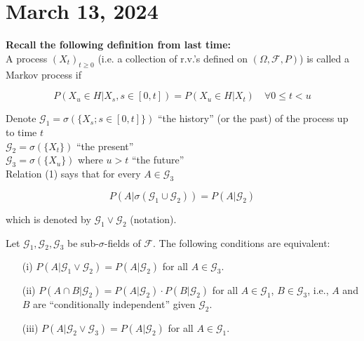\section{March 13, 2024}
\textbf{Recall the following definition from last time:} \\
A process $(X_t)_{t\geq0}$ (i.e. a collection of r.v.'s defined on $(\Omega, \mathcal{F}, P)$) is called a Markov process if 

\begin{equation}
    P(X_u \in H | X_s, s \in [0,t]) = P(X_u \in H | X_t) \quad \forall 0 \leq t < u
\end{equation}

Denote $\mathcal{G}_1 = \sigma(\{X_s ; s \in [0,t]\})$ ``the history'' (or the past) of the process up to time $t$ \\
$\mathcal{G}_2 = \sigma(\{X_t\})$ ``the present'' \\
$\mathcal{G}_3 = \sigma(\{X_u\})$ where $u>t$ ``the future'' \\
Relation (1) says that for every $A \in \mathcal{G}_3$

\begin{equation}
    P(A | \sigma(\mathcal{G}_1 \cup \mathcal{G}_2)) = P(A | \mathcal{G}_2)
\end{equation}

which is denoted by $\mathcal{G}_1 \lor \mathcal{G}_2$ (notation).


\begin{lemma}[Problem 3.11]
Let $\mathcal{G}_1, \mathcal{G}_2, \mathcal{G}_3$ be sub-$\sigma$-fields of $\mathcal{F}$. The following conditions are equivalent:

\begin{itemize}
    \item[(i)] $P(A | \mathcal{G}_1 \vee \mathcal{G}_2) = P(A | \mathcal{G}_2)$ for all $A \in \mathcal{G}_3$.
    \item[(ii)] $P(A \cap B | \mathcal{G}_2) = P(A | \mathcal{G}_2) \cdot P(B | \mathcal{G}_2)$ for all $A \in \mathcal{G}_1$, $B \in \mathcal{G}_3$, i.e., $A$ and $B$ are ``conditionally independent'' given $\mathcal{G}_2$.
    \item[(iii)] $P(A | \mathcal{G}_2 \vee \mathcal{G}_3) = P(A | \mathcal{G}_2)$ for all $A \in \mathcal{G}_1$.
\end{itemize}
\end{lemma}


